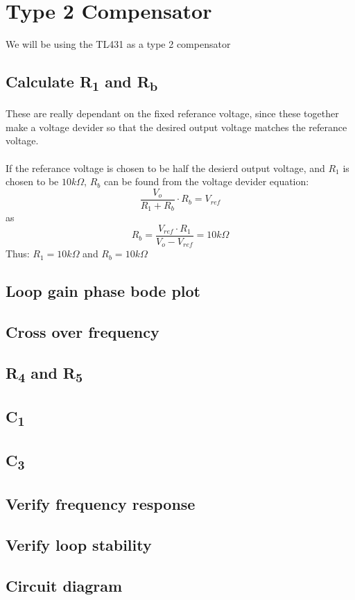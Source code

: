 \section{Type 2 Compensator}
We will be using the TL431 as a type 2 compensator
\subsection{Calculate R\textsubscript{1} and R\textsubscript{b}}
These are really dependant on the fixed referance voltage, since these together make a voltage devider so that the desired output voltage matches the referance voltage.
\\\\
If the referance voltage is chosen to be half the desierd output voltage, and $R_1$ is chosen to be $10k \Omega $, $R_b$ can be found from the voltage devider equation:
\[
\frac{V_o}{R_1 + R_b} \cdot R_b = V_{ref}
\]
as
\[
R_b = \frac{V_{ref}\cdot R_1}{V_o - V_{ref}} = 10k\Omega
\]
Thus: $R_1 = 10k\Omega$ and $R_b = 10k\Omega$
\subsection{Loop gain phase bode plot}

\subsection{Cross over frequency}
\subsection{R\textsubscript{4} and R\textsubscript{5}}
\subsection{C\textsubscript{1}}
\subsection{C\textsubscript{3}}
\subsection{Verify frequency response}
\subsection{Verify loop stability}
\subsection{Circuit diagram}